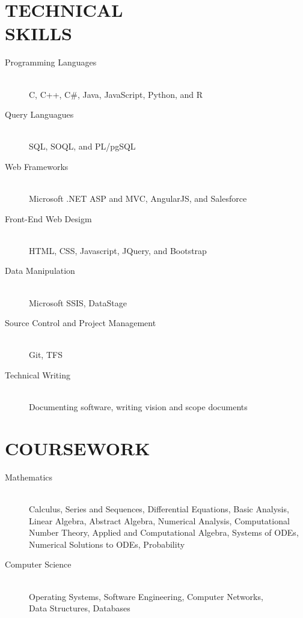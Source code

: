 \documentclass[margin]{res}
\begin{document}
\begin{resume}
 
\section{TECHNICAL \\ SKILLS} 
                \begin{description}
                  \item[Programming Languages] \hfill \\
                  C, C++, C\#, Java, JavaScript, Python, and R 
                  \item[Query Languagues] \hfill \\
                  SQL, SOQL, and PL/pgSQL 
                  \item[Web Frameworks] \hfill \\
                  Microsoft .NET ASP and MVC, AngularJS, and Salesforce 
                  \item[Front-End Web Desigm] \hfill \\
                  HTML, CSS, Javascript, JQuery, and Bootstrap
                  \item[Data Manipulation] \hfill \\
                  Microsoft SSIS, DataStage
                  \item[Source Control and Project Management] \hfill \\
                  Git, TFS
                  \item[Technical Writing] \hfill \\
                  Documenting software, writing vision and scope documents 
                \end{description}
                    
                
\section{COURSEWORK}
    \begin{description}
                  \item[Mathematics] \hfill \\
                  Calculus, Series and Sequences, Differential Equations, Basic Analysis, \\ Linear Algebra, Abstract Algebra, Numerical Analysis, Computational Number Theory, Applied and Computational Algebra, Systems of ODEs, Numerical Solutions to ODEs, Probability
                  \item[Computer Science] \hfill \\
                  Operating Systems, Software Engineering, Computer Networks, \\ Data Structures, Databases
                  
                \end{description}

\end{resume}
\end{document}
